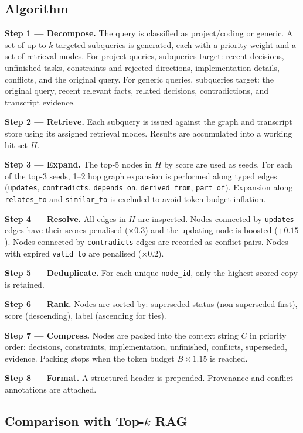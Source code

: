 \documentclass[conference]{IEEEtran}
\begin{document}
\subsection{Algorithm}

\textbf{Step 1 --- Decompose.} The query is classified as project/coding or generic.
A set of up to $k$ targeted subqueries is generated, each with a priority weight and a set
of retrieval modes. For project queries, subqueries target: recent decisions, unfinished
tasks, constraints and rejected directions, implementation details, conflicts, and the
original query. For generic queries, subqueries target: the original query, recent relevant
facts, related decisions, contradictions, and transcript evidence.

\textbf{Step 2 --- Retrieve.} Each subquery is issued against the graph and transcript store
using its assigned retrieval modes. Results are accumulated into a working hit set $H$.

\textbf{Step 3 --- Expand.} The top-5 nodes in $H$ by score are used as seeds. For each of
the top-3 seeds, 1--2 hop graph expansion is performed along typed edges (\texttt{updates},
\texttt{contradicts}, \texttt{depends\_on}, \texttt{derived\_from}, \texttt{part\_of}).
Expansion along \texttt{relates\_to} and \texttt{similar\_to} is excluded to avoid token
budget inflation.

\textbf{Step 4 --- Resolve.} All edges in $H$ are inspected. Nodes connected by
\texttt{updates} edges have their scores penalised ($\times 0.3$) and the updating node is
boosted ($+0.15$). Nodes connected by \texttt{contradicts} edges are recorded as conflict
pairs. Nodes with expired \texttt{valid\_to} are penalised ($\times 0.2$).

\textbf{Step 5 --- Deduplicate.} For each unique \texttt{node\_id}, only the highest-scored
copy is retained.

\textbf{Step 6 --- Rank.} Nodes are sorted by: superseded status (non-superseded first),
score (descending), label (ascending for ties).

\textbf{Step 7 --- Compress.} Nodes are packed into the context string $C$ in priority order:
decisions, constraints, implementation, unfinished, conflicts, superseded, evidence. Packing
stops when the token budget $B \times 1.15$ is reached.

\textbf{Step 8 --- Format.} A structured header is prepended. Provenance and conflict
annotations are attached.

\subsection{Comparison with Top-$k$ RAG}
\end{document}
